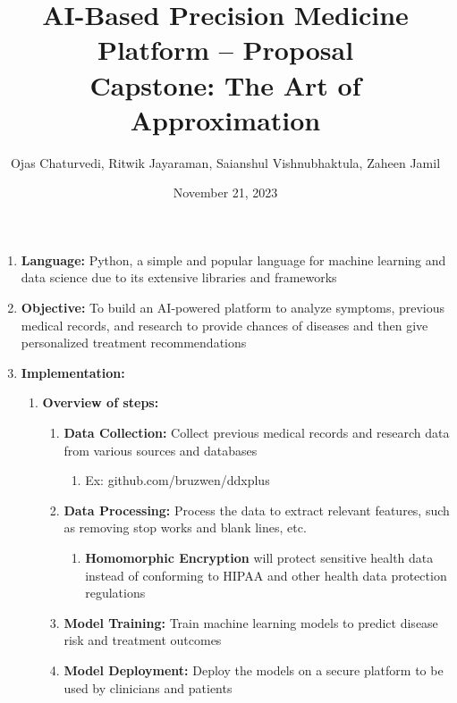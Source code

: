 \documentclass{article}
\title{AI-Based Precision Medicine Platform -- Proposal \\ \large Capstone: The Art of Approximation}
\author{Ojas Chaturvedi, Ritwik Jayaraman, Saianshul Vishnubhaktula, Zaheen Jamil}
\date{November 21, 2023}
\begin{document}
\maketitle


\begin{enumerate}
    \item \textbf{Language:} Python, a simple and popular language for machine learning and data science due to its extensive libraries and frameworks
    \item \textbf{Objective:} To build an AI-powered platform to analyze symptoms, previous medical records, and research to provide chances of diseases and then give personalized treatment recommendations
    \item \textbf{Implementation:}
        \begin{enumerate}
            \item \textbf{Overview of steps:}
                \begin{enumerate}
                    \item \textbf{Data Collection:} Collect previous medical records and research data from various sources and databases
                    \begin{enumerate}
                        \item Ex: github.com/bruzwen/ddxplus
                    \end{enumerate}
                    \item \textbf{Data Processing:} Process the data to extract relevant features, such as removing stop works and blank lines, etc.
                    \begin{enumerate}
                        \item \textbf{Homomorphic Encryption} will protect sensitive health data instead of conforming to HIPAA and other health data protection regulations
                    \end{enumerate}
                    \item \textbf{Model Training:} Train machine learning models to predict disease risk and treatment outcomes
                    \item \textbf{Model Deployment:} Deploy the models on a secure platform to be used by clinicians and patients
                \end{enumerate}

\end{enumerate}
\end{enumerate}
\end{document}
